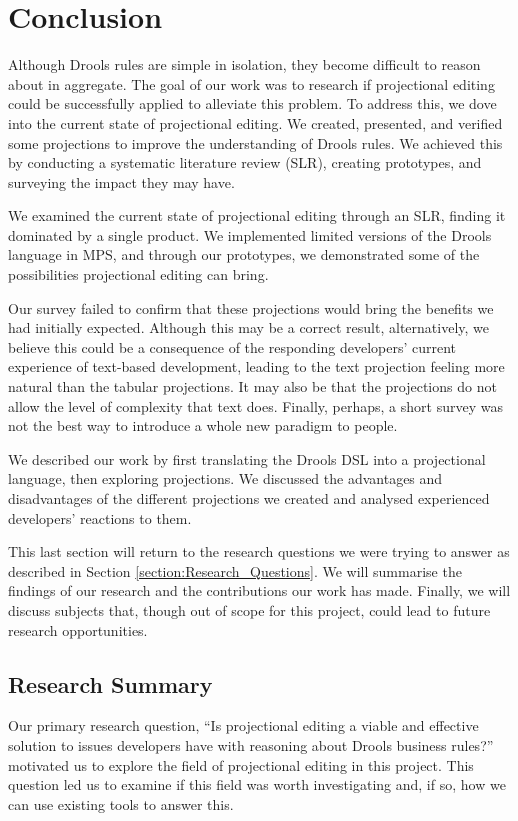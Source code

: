 \chapter{Conclusion}
\label{chapter:Conclusion}

Although Drools rules are simple in isolation, they become difficult to reason about in aggregate.
The goal of our work was to research if projectional editing could be successfully applied to alleviate this problem.
To address this, we dove into the current state of projectional editing.
We created, presented, and verified some projections to improve the understanding of Drools rules.
We achieved this by conducting a systematic literature review (SLR), creating prototypes, and surveying the impact they may have.

We examined the current state of projectional editing through an SLR, finding it dominated by a single product.
We implemented limited versions of the Drools language in MPS, and through our prototypes, we demonstrated some of the possibilities projectional editing can bring.

Our survey failed to confirm that these projections would bring the benefits we had initially expected.
Although this may be a correct result, alternatively, we believe this could be a consequence of the responding developers' current experience of text-based development, leading to the text projection feeling more natural than the tabular projections.
It may also be that the projections do not allow the level of complexity that text does.
Finally, perhaps, a short survey was not the best way to introduce a whole new paradigm to people.  

We described our work by first translating the Drools DSL into a projectional language, then exploring projections.
We discussed the advantages and disadvantages of the different projections we created and analysed experienced developers' reactions to them.

This last section will return to the research questions we were trying to answer as described in Section \ref{section:Research_Questions}. 
We will summarise the findings of our research and the contributions our work has made.
Finally, we will discuss subjects that, though out of scope for this project, could lead to future research opportunities.

\section{Research Summary}
Our primary research question, ``Is projectional editing a viable and effective solution to issues developers have with reasoning about Drools business rules?'' motivated us to explore the field of projectional editing in this project.
This question led us to examine if this field was worth investigating and, if so, how we can use existing tools to answer this.

